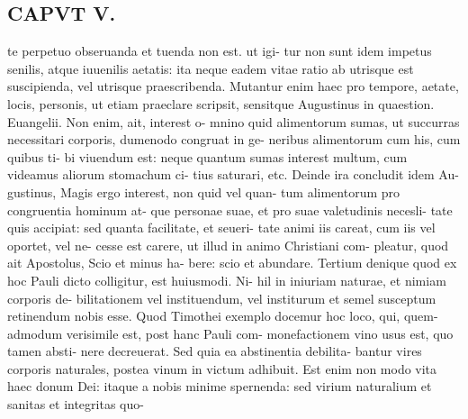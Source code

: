 \documentclass{article}
\begin{document}
\begin{pages}
\section*{CAPVT V. }
\marginpar{[ p.381 ]}te perpetuo obseruanda et tuenda non est. ut igi- tur non sunt idem impetus senilis, atque iuuenilis aetatis: ita neque eadem vitae ratio ab utrisque est suscipienda, vel utrisque praescribenda. Mutantur enim haec pro tempore, aetate, locis, personis, ut etiam praeclare scripsit, sensitque Augustinus in quaestion. Euangelii. Non enim, ait, interest o- mnino quid alimentorum sumas, ut succurras necessitari corporis, dumenodo congruat in ge- neribus alimentorum cum his, cum quibus ti- bi viuendum est: neque quantum sumas interest multum, cum videamus aliorum stomachum ci- tius saturari, etc. Deinde ira concludit idem Au- gustinus, Magis ergo interest, non quid vel quan- tum alimentorum pro congruentia hominum at- que personae suae, et pro suae valetudinis necesli- tate quis accipiat: sed quanta facilitate, et seueri- tate animi iis careat, cum iis vel oportet, vel ne- cesse est carere, ut illud in animo Christiani com- pleatur, quod ait Apostolus, Scio et minus ha- bere: scio et abundare. Tertium denique quod ex hoc Pauli dicto colligitur, est huiusmodi. Ni- hil in iniuriam naturae, et nimiam corporis de- bilitationem vel instituendum, vel institurum et semel susceptum retinendum nobis esse. Quod Timothei exemplo docemur hoc loco, qui, quem- admodum verisimile est, post hanc Pauli com- monefactionem vino usus est, quo tamen absti- nere decreuerat. Sed quia ea abstinentia debilita- bantur vires corporis naturales, postea vinum in victum adhibuit. Est enim non modo vita haec donum Dei: itaque a nobis minime spernenda: sed virium naturalium et sanitas et integritas quo- 

\end{pages}
\end{document}
